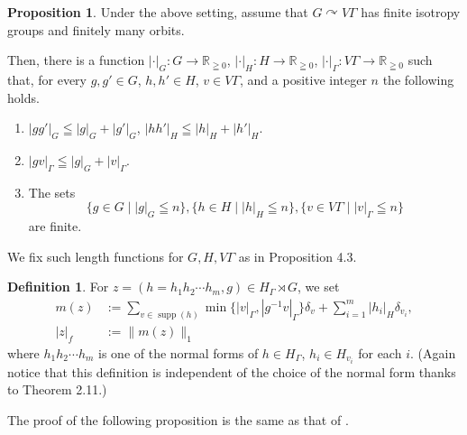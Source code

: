 \documentclass{amsart}
\theoremstyle{definition}
\newtheorem{proposition}[theorem]{Proposition}
\newtheorem{definition}[theorem]{Definition}
\newcommand{\action}{\curvearrowright}
\begin{document}
\begin{proposition}
Under the above setting, assume that $G\action V\Gamma$ has finite isotropy groups and finitely many orbits. 

Then, there is a function $|\cdot|_G: G\to \mathbb{R}_{\geqq 0}$, $|\cdot|_H: H\to \mathbb{R}_{\geqq 0}$, $|\cdot|_{\Gamma}: V\Gamma \to \mathbb{R}_{\geqq 0}$ such that, for every $g, g'\in G$, $h, h'\in H$, $v\in V\Gamma$, and a positive integer $n$ the following holds. 
\begin{enumerate}
\item $|gg'|_G\leqq |g|_G+|g'|_G$, $|hh'|_H\leqq |h|_H+|h'|_H$.

\item $|gv|_{\Gamma}\leqq |g|_G+|v|_{\Gamma}$.

\item The sets 
\[
\{ g\in G \mid |g|_G\leqq n\}, \{ h\in H \mid |h|_H\leqq n\}, \{ v\in V\Gamma \mid |v|_{\Gamma}\leqq n\} 
\]
are finite. 
\end{enumerate}
\end{proposition}

We fix such length functions for $G, H, V\Gamma$ as in Proposition 4.3.

\begin{definition}
For $z=(h=h_1h_2\cdots h_m, g)\in H_{\Gamma}\rtimes G$, we set
\begin{align}
m(z) &:=\sum_{v\in \mathop{supp}(h)} \min\{ |v|_{\Gamma}, |g^{-1}v|_{\Gamma}\} \delta_{v}+ \sum_{i=1}^m |h_i|_{H} \delta_{v_i}, \\
|z|_{f} &:=\| m(z)\|_1
\end{align}
where $h_1h_2\cdots h_m$ is one of the normal forms of $h\in H_{\Gamma}$, $h_i\in H_{v_i}$ for each $i$. 
(Again notice that this definition is independent of the choice of the normal form thanks to Theorem 2.11.)
\end{definition}

The proof of the following proposition is the same as that of \cite[Lemma 5.5, 5.6]{hik}. 
\end{document}
